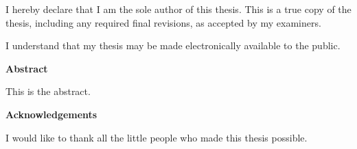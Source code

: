 \noindent
I hereby declare that I am the sole author of this thesis. This is a true copy of the thesis, including any required final revisions, as accepted by my examiners.

\bigskip

\noindent
I understand that my thesis may be made electronically available to the public.

\cleardoublepage


\begin{center}\textbf{Abstract}\end{center}

This is the abstract.

\cleardoublepage


\begin{center}\textbf{Acknowledgements}\end{center}

I would like to thank all the little people who made this thesis possible.
\cleardoublepage

\renewcommand\contentsname{Table of Contents}
\tableofcontents
\cleardoublepage
{}    %

\listoftables
\cleardoublepage
{}		%

\listoffigures
\cleardoublepage
{}		%

\printglossaries
\cleardoublepage
{}		%


